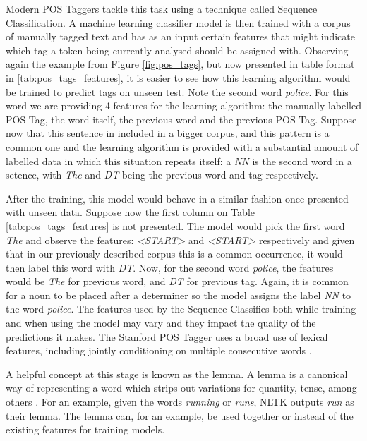 \documentclass[11pt,a4paper,openright]{memoir}
\begin{document}
Modern POS Taggers tackle this task using a technique called Sequence Classification. A machine learning classifier model is then trained with a corpus of manually tagged text and has as an input certain features that might indicate which tag a token being currently analysed should be assigned with. Observing again the example from Figure \ref{fig:pos_tags}, but now presented in table format in \ref{tab:pos_tags_features}, it is easier to see how this learning algorithm would be trained to predict tags on unseen test. Note the second word \emph{police}. For this word we are providing 4 features for the learning algorithm: the manually labelled POS Tag, the word itself, the previous word and the previous POS Tag. Suppose now that this sentence in included in a bigger corpus, and this pattern is a common one and the learning algorithm is provided with a substantial amount of labelled data in which this situation repeats itself: a \emph{NN} is the second word in a setence, with \emph{The} and \emph{DT} being the previous word and tag respectively.

After the training, this model would behave in a similar fashion once presented with unseen data. Suppose now the first column on Table \ref{tab:pos_tags_features} is not presented. The model would pick the first word \emph{The} and observe the features: \emph{<START>} and \emph{<START>} respectively and given that in our previously described corpus this is a common occurrence, it would then label this word with \emph{DT}. Now, for the second word \emph{police}, the features would be \emph{The} for previous word, and \emph{DT} for previous tag. Again, it is common for a noun to be placed after a determiner so the model assigns the label \emph{NN} to the word \emph{police}. The features used by the Sequence Classifies both while training and when using the model may vary and they impact the quality of the predictions it makes. The Stanford POS Tagger uses a broad use of lexical features, including jointly conditioning on multiple consecutive words \cite{Toutanova:2003:FPT:1073445.1073478}.

A helpful concept at this stage is known as the lemma. A lemma is a canonical way of representing a word which strips out variations for quantity, tense, among others \cite{Jurafsky:2000:SLP:555733}. For an example, given the words \emph{running} or \emph{runs}, NLTK \cite{BirdKleinLoper09} outputs \emph{run} as their lemma. The lemma can, for an example, be used together or instead of the existing features for training models.
\end{document}
